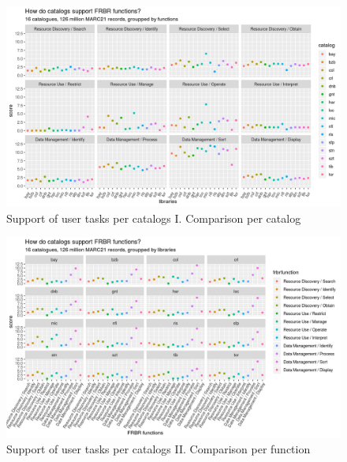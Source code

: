 \begin{figure}
\includegraphics[width=\textwidth]{images/chapter04/functional-analysis-of-catalogs-by-catalogs.png}
\caption{Support of user tasks per catalogs I. Comparison per catalog}
\label{figure:functions-by-catalogs}
\end{figure}

\begin{figure}
\includegraphics[width=\textwidth]{images/chapter04/functional-analysis-of-catalogs-by-functions.png}
\caption{Support of user tasks per catalogs II. Comparison per function}
\label{figure:functions-by-functions}
\end{figure}

